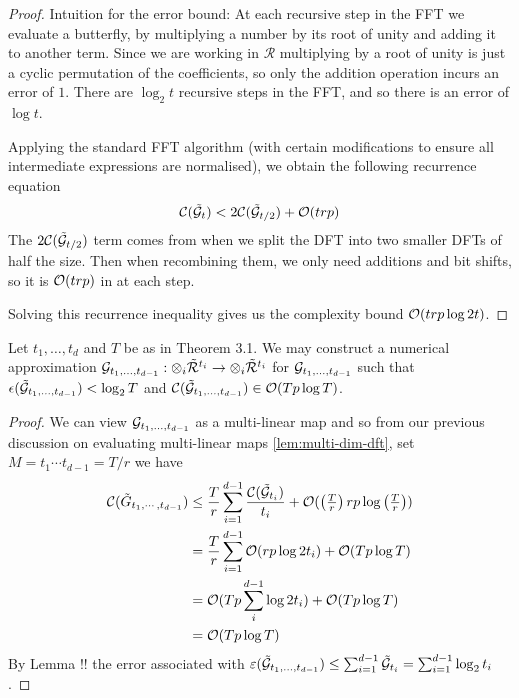 \begin{proof}
    Intuition for the error bound: At each recursive step in the FFT we evaluate a butterfly, by multiplying a number by its root of unity and adding it to another term. Since we are working in $\mathscr{R}$ multiplying by a root of unity is just a cyclic permutation of the coefficients, so only the addition operation incurs an error of $1$. There are $\log_2 t$ recursive steps in the FFT, and so there is an error of $\log t$.

    \medskip

    Applying the standard FFT algorithm (with certain modifications to ensure all intermediate expressions are normalised), we obtain the following recurrence equation
    \[
        \mathcal C(\tilde{\mathcal G}_t) < 2 \mathcal C(\tilde{\mathcal G}_{t/2}) + \mathcal O(trp)
    \]
    The $2 \mathcal C(\tilde{\mathcal G}_{t/2})$ term comes from when we split the DFT into two smaller DFTs of half the size. Then when recombining them, we only need additions and bit shifts, so it is $\mathcal O(trp)$ in at each step.

    Solving this recurrence inequality gives us the complexity bound $\mathcal O(trp \log 2 t)$.
\end{proof}

\begin{proposition}
    Let $t_1, \ldots, t_d$ and $T$ be as in Theorem 3.1. We may construct a numerical approximation $\mathcal G_{t_1, \ldots, t_{d-1}}: \otimes_i \tilde{\mathcal R}^{t_i} \to \otimes_i \tilde{\mathcal R}^{t_i}$ for $\mathcal G_{t_1, \ldots, t_{d-1}}$ such that $\epsilon(\tilde{\mathcal G}_{t_1, \ldots, t_{d-1}}) < \log_2 T$ and $\mathcal C(\tilde{\mathcal G}_{t_1, \ldots, t_{d-1}}) \in \mathcal O(Tp \log T)$.
\end{proposition}

\begin{proof}
    We can view $\mathcal G_{t_1, \ldots, t_{d-1}}$ as a multi-linear map and so from our previous discussion on evaluating multi-linear maps \eqref{lem:multi-dim-dft}, set $M = t_1\cdots t_{d-1} = T/r$ we have
    \begin{align*}
        \mathcal C(\tilde{G}_{t_1, \cdots, t_{d-1}}) &\leq \frac{T}{r} \sum^{d-1}_{i=1} \frac{\mathcal C(\tilde{\mathcal G}_{t_i})}{t_i} + \mathcal O(\left(\tfrac{T}{r}\right)rp\log \left(\tfrac{T}{r}\right))\\
                                                &= \frac{T}{r}\sum^{d-1}_{i=1}\mathcal O(rp\log 2t_i) + \mathcal O(Tp \log T)\\
                                                &= \mathcal O(Tp \sum_i^{d-1}\log 2t_i) + \mathcal O(Tp \log T)\\
                                                &= \mathcal O(Tp \log T)
    \end{align*}
    By Lemma !!  the error associated with $\varepsilon(\tilde{\mathcal G}_{t_1, \ldots, t_{d-1}}) \le \sum_{i=1}^{d-1}\tilde{\mathcal G}_{t_i} = \sum_{i=1}^{d-1} \log_2 t_i$.
\end{proof}

